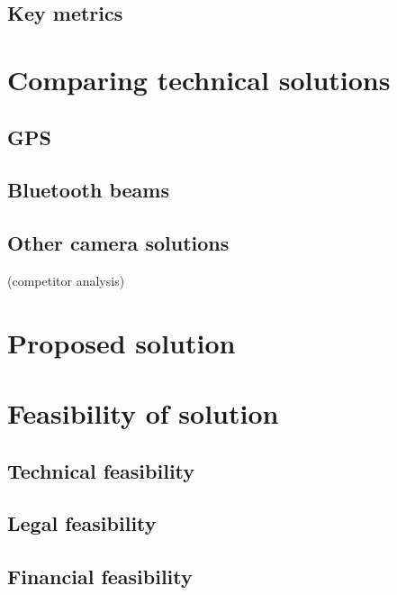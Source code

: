 \subsection{Key metrics}



\section{Comparing technical solutions}

\subsection{GPS}
\subsection{Bluetooth beams}
\subsection{Other camera solutions}
(competitor analysis)

\section{Proposed solution}
\section{Feasibility of solution}
\subsection{Technical feasibility}
\subsection{Legal feasibility}
\subsection{Financial feasibility}


